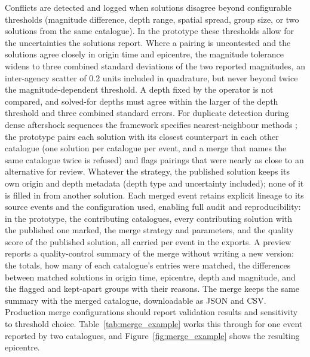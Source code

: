 \documentclass[11pt]{article}
\begin{document}
Conflicts are detected and logged when solutions disagree beyond configurable thresholds (magnitude difference, depth range, spatial spread, group size, or two solutions from the same catalogue). In the prototype these thresholds allow for the uncertainties the solutions report. Where a pairing is uncontested and the solutions agree closely in origin time and epicentre, the magnitude tolerance widens to three combined standard deviations of the two reported magnitudes, an inter-agency scatter of 0.2 units included in quadrature, but never beyond twice the magnitude-dependent threshold. A depth fixed by the operator is not compared, and solved-for depths must agree within the larger of the depth threshold and three combined standard errors. For duplicate detection during dense aftershock sequences the framework specifies nearest-neighbour methods \citep{Tanaka2022}; the prototype pairs each solution with its closest counterpart in each other catalogue (one solution per catalogue per event, and a merge that names the same catalogue twice is refused) and flags pairings that were nearly as close to an alternative for review. Whatever the strategy, the published solution keeps its own origin and depth metadata (depth type and uncertainty included); none of it is filled in from another solution. Each merged event retains explicit lineage to its source events and the configuration used, enabling full audit and reproducibility: in the prototype, the contributing catalogues, every contributing solution with the published one marked, the merge strategy and parameters, and the quality score of the published solution, all carried per event in the exports. A preview reports a quality-control summary of the merge without writing a new version: the totals, how many of each catalogue's entries were matched, the differences between matched solutions in origin time, epicentre, depth and magnitude, and the flagged and kept-apart groups with their reasons. The merge keeps the same summary with the merged catalogue, downloadable as JSON and CSV. Production merge configurations should report validation results and sensitivity to threshold choice. Table~\ref{tab:merge_example} works this through for one event reported by two catalogues, and Figure~\ref{fig:merge_example} shows the resulting epicentre.
\end{document}
